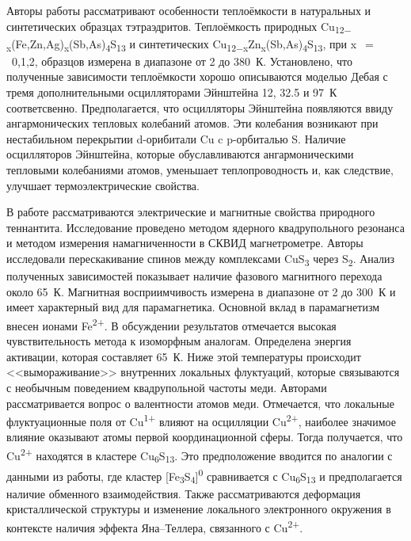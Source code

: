 Авторы работы \cite{Lara-Curzio2014} рассматривают особенности теплоёмкости в натуральных и синтетических образцах тэтраэдритов. Теплоёмкость природных  Cu\textsubscript{12$-$x}(Fe,Zn,Ag)\textsubscript{x}(Sb,As)\textsubscript{4}S\textsubscript{13} и синтетических Cu\textsubscript{12$-$x}Zn\textsubscript{x}(Sb,As)\textsubscript{4}S\textsubscript{13}, при x~$=$~0,1,2, образцов измерена в диапазоне от 2 до 380~К. Установлено, что полученные зависимости теплоёмкости хорошо описываются моделью Дебая с тремя дополнительными осцилляторами Эйнштейна 12, 32.5 и 97~К соответсвенно. Предполагается, что осцилляторы Эйнштейна появляются ввиду ангармонических тепловых колебаний атомов. Эти колебания возникают при нестабильном перекрытии d-орибитали Cu c p-орбиталью S.
Наличие осцилляторов Эйнштейна, которые обуславливаются ангармоническими тепловыми колебаниями атомов, уменьшает теплопроводность и, как следствие, улучшает термоэлектрические свойства.

В работе \cite{Gainov2008} рассматриваются электрические и магнитные свойства природного теннантита. Исследование проведено методом ядерного квадрупольного резонанса и методом измерения намагниченности в СКВИД магнетрометре. Авторы исследовали перескакивание спинов между комплексами CuS\textsubscript{3} через S\textsubscript{2}. Анализ полученных зависимостей показывает наличие фазового магнитного перехода около 65~К. Магнитная восприимчивость измерена в диапазоне от 2 до 300~К и имеет характерный вид для парамагнетика. Основной вклад в парамагнетизм внесен ионами Fe\textsuperscript{2+}. В обсуждении результатов отмечается высокая чувствительность метода к изоморфным аналогам. Определена энергия активации, которая составляет 65~К. Ниже этой температуры происходит <<вымораживание>> внутренних локальных флуктуаций, которые связываются с необычным поведением квадрупольной частоты меди. Авторами рассматривается вопрос о валентности атомов меди. Отмечается, что локальные флуктуационные поля от Cu\textsuperscript{1+} влияют на осцилляции Cu\textsuperscript{2+}, наиболее значимое влияние оказывают атомы первой координационной сферы. Тогда получается, что Cu\textsuperscript{2+} находятся в кластере Cu\textsubscript{6}S\textsubscript{13}. Это предположение вводится по аналогии с данными из работы\cite{Pattrick1993}, где кластер [Fe\textsubscript{3}S\textsubscript{4}]\textsuperscript{0} сравнивается с Cu\textsubscript{6}S\textsubscript{13} и предполагается наличие обменного взаимодействия.  Также рассматриваются деформация кристаллической структуры и изменение локального электронного окружения в контексте наличия эффекта Яна--Теллера, связанного с  Cu\textsuperscript{2+}.

